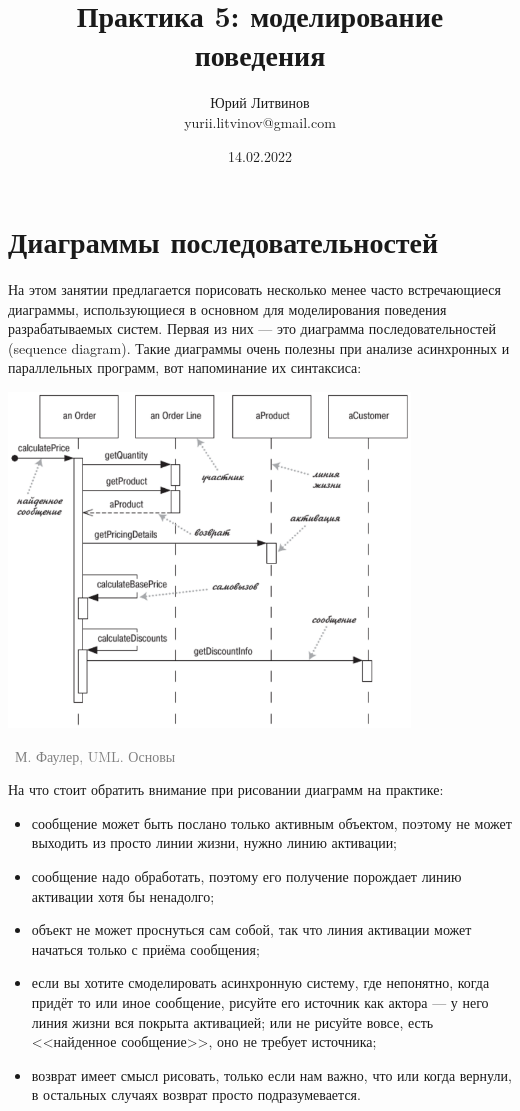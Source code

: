 \documentclass[a5paper]{article}
\title{Практика 5: моделирование поведения}
\author{Юрий Литвинов\\\small{yurii.litvinov@gmail.com}}
\date{14.02.2022}
\newcommand{\attribution}[1] {
    \vspace{-5mm}\begin{flushright}\begin{scriptsize}\textcolor{gray}{\textcopyright\, #1}\end{scriptsize}\end{flushright}
}
\begin{document}
\maketitle
\thispagestyle{empty}

\section{Диаграммы последовательностей}

На этом занятии предлагается порисовать несколько менее часто встречающиеся диаграммы, использующиеся в основном для моделирования поведения разрабатываемых систем. Первая из них --- это диаграмма последовательностей (sequence diagram). Такие диаграммы очень полезны при анализе асинхронных и параллельных программ, вот напоминание их синтаксиса:

\begin{center}
    \includegraphics[width=0.8\textwidth]{sequenceDiagram.png}
    \attribution{М. Фаулер, UML. Основы}
\end{center}

На что стоит обратить внимание при рисовании диаграмм на практике:

\begin{itemize}
    \item сообщение может быть послано только активным объектом, поэтому не может выходить из просто линии жизни, нужно линию активации;
    \item сообщение надо обработать, поэтому его получение порождает линию активации хотя бы ненадолго;
    \item объект не может проснуться сам собой, так что линия активации может начаться только с приёма сообщения;
    \item если вы хотите смоделировать асинхронную систему, где непонятно, когда придёт то или иное сообщение, рисуйте его источник как актора --- у него линия жизни вся покрыта активацией; или не рисуйте вовсе, есть <<найденное сообщение>>, оно не требует источника;
    \item возврат имеет смысл рисовать, только если нам важно, что или когда вернули, в остальных случаях возврат просто подразумевается.
\end{itemize}
\end{document}
